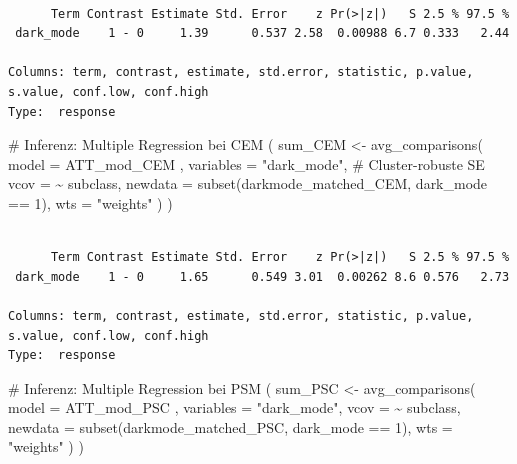 \documentclass[
  a4paper,
  DIV=11,
  oneside]{scrreprt}
\newenvironment{Shaded}{\begin{snugshade}}{\end{snugshade}}
\newcommand{\AttributeTok}[1]{\textcolor[rgb]{0.40,0.45,0.13}{#1}}
\newcommand{\CommentTok}[1]{\textcolor[rgb]{0.37,0.37,0.37}{#1}}
\newcommand{\DecValTok}[1]{\textcolor[rgb]{0.68,0.00,0.00}{#1}}
\newcommand{\FunctionTok}[1]{\textcolor[rgb]{0.28,0.35,0.67}{#1}}
\newcommand{\NormalTok}[1]{\textcolor[rgb]{0.00,0.23,0.31}{#1}}
\newcommand{\OtherTok}[1]{\textcolor[rgb]{0.00,0.23,0.31}{#1}}
\newcommand{\SpecialCharTok}[1]{\textcolor[rgb]{0.37,0.37,0.37}{#1}}
\newcommand{\StringTok}[1]{\textcolor[rgb]{0.13,0.47,0.30}{#1}}
\begin{document}
\begin{verbatim}

      Term Contrast Estimate Std. Error    z Pr(>|z|)   S 2.5 % 97.5 %
 dark_mode    1 - 0     1.39      0.537 2.58  0.00988 6.7 0.333   2.44

Columns: term, contrast, estimate, std.error, statistic, p.value, s.value, conf.low, conf.high 
Type:  response 
\end{verbatim}

\begin{Shaded}
\begin{Highlighting}[]
\CommentTok{\# Inferenz: Multiple Regression bei CEM}
\NormalTok{(}
\NormalTok{  sum\_CEM }\OtherTok{\textless{}{-}} \FunctionTok{avg\_comparisons}\NormalTok{(}
  \AttributeTok{model =}\NormalTok{ ATT\_mod\_CEM ,}
  \AttributeTok{variables =} \StringTok{"dark\_mode"}\NormalTok{,}
  \CommentTok{\# Cluster{-}robuste SE}
  \AttributeTok{vcov =} \SpecialCharTok{\textasciitilde{}}\NormalTok{ subclass, }
  \AttributeTok{newdata =} \FunctionTok{subset}\NormalTok{(darkmode\_matched\_CEM, dark\_mode }\SpecialCharTok{==} \DecValTok{1}\NormalTok{),}
  \AttributeTok{wts =} \StringTok{"weights"}
\NormalTok{  )}
\NormalTok{)}
\end{Highlighting}
\end{Shaded}

\begin{verbatim}

      Term Contrast Estimate Std. Error    z Pr(>|z|)   S 2.5 % 97.5 %
 dark_mode    1 - 0     1.65      0.549 3.01  0.00262 8.6 0.576   2.73

Columns: term, contrast, estimate, std.error, statistic, p.value, s.value, conf.low, conf.high 
Type:  response 
\end{verbatim}

\begin{Shaded}
\begin{Highlighting}[]
\CommentTok{\# Inferenz: Multiple Regression bei PSM}
\NormalTok{(}
\NormalTok{  sum\_PSC }\OtherTok{\textless{}{-}} \FunctionTok{avg\_comparisons}\NormalTok{(}
    \AttributeTok{model =}\NormalTok{ ATT\_mod\_PSC ,}
    \AttributeTok{variables =} \StringTok{"dark\_mode"}\NormalTok{,}
    \AttributeTok{vcov =} \SpecialCharTok{\textasciitilde{}}\NormalTok{ subclass, }
    \AttributeTok{newdata =} \FunctionTok{subset}\NormalTok{(darkmode\_matched\_PSC, dark\_mode }\SpecialCharTok{==} \DecValTok{1}\NormalTok{),}
    \AttributeTok{wts =} \StringTok{"weights"}
\NormalTok{  )}
\NormalTok{)}
\end{Highlighting}
\end{Shaded}
\end{document}
